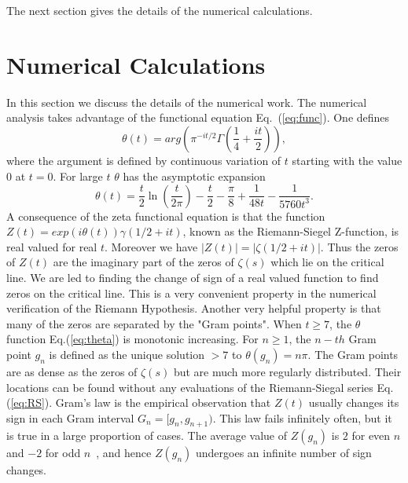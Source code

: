 \documentclass[twoside]{article}
\begin{document}
The next section gives the details of the numerical calculations.

\section{\label{sec3}Numerical Calculations}

In this section we discuss the details of the numerical work. 
The numerical analysis takes advantage of the functional 
equation Eq.~(\ref{eq:func}).
One defines
\begin{equation}
\theta(t) = arg (\pi^{−it/2} \Gamma(\frac{1}{4} + \frac{it}{2})), 
\label{eq:theta}
\end{equation}
where the argument is defined by continuous variation of $t$ starting with the value $0$ at $t = 0$.
For large $t$ $\theta$ has the asymptotic expansion
\begin{equation}
\theta(t) = \frac{t}{2}\ln (\frac{t}{2\pi}) - \frac{t}{2} - \frac{\pi}{8} + \frac{1}{48t} - \frac{1}{5760t^3}. 
\label{eq:thetaAsymptotic}
\end{equation}
A consequence of the zeta functional equation is that the function 
$Z(t)=exp(i\theta(t))\gamma(1/2 +it)$,
known as the Riemann-Siegel Z-function, is real valued for real $t$. 
Moreover we have $|Z(t)| = |\zeta(1/2+it)|$. Thus the zeros of $Z(t)$ are the imaginary part of the zeros 
of $\zeta(s)$ which lie on the critical line. We are led to finding the change of sign 
of a real valued function 
to find zeros on the critical line. This is a very convenient property in the numerical verification 
of the Riemann Hypothesis.
Another very helpful property is that many of the zeros are separated by the
"Gram points".  When $t \ge 7$, the $\theta$ function Eq.(\ref{eq:theta}) is monotonic increasing. 
For $n \ge 1$, the $n-th$ Gram point $g_n$ is defined as the unique solution $> 7$ to
$\theta (g_n) = n\pi$.
The Gram points are as dense as the zeros of $\zeta(s)$ but are much more regularly distributed.
Their locations can be found without any evaluations of the Riemann-Siegal series Eq.(\ref{eq:RS}).
Gram's law is the empirical observation that $Z(t)$ usually changes its sign in each Gram interval 
$G_n = [g_n,g_{n+1})$. 
This law fails infinitely often, but it is true in a large proportion of cases.
The average value of $Z(g_n)$ is $2$ for even $n$ and $-2$ for odd $n$~\cite{Titchmarsh(1986)},
and hence $Z(g_n)$ undergoes an infinite number of sign changes.
\end{document}
